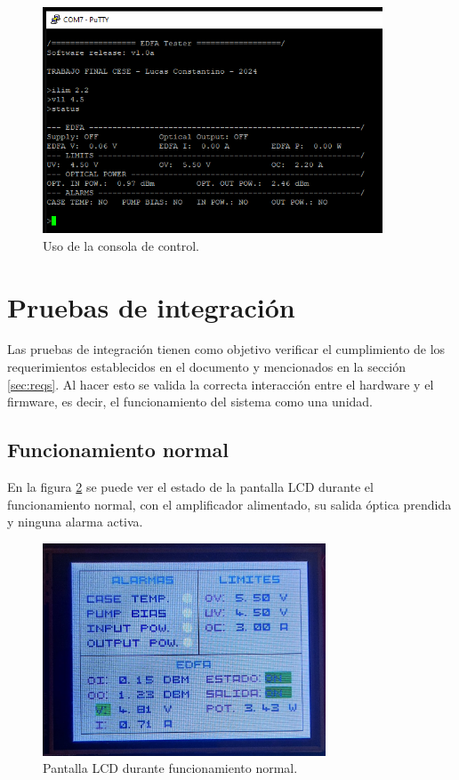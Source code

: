 \begin{figure}[H]
\centering
\includegraphics[width=0.9\textwidth]{./Figures/pruebaConsola.png}
\caption{Uso de la consola de control.}
\label{fig:pruebaConsola}
\end{figure}

\section{Pruebas de integración}
\label{sec:pruebasInt}

Las pruebas de integración tienen como objetivo verificar el cumplimiento de los requerimientos establecidos en el documento \citep{DOC_REQ} y mencionados en la sección \ref{sec:reqs}. Al hacer esto se valida la correcta interacción entre el hardware y el firmware, es decir, el funcionamiento del sistema como una unidad.

\subsection{Funcionamiento normal}

En la figura \ref{fig:funcNorm} se puede ver el estado de la pantalla LCD durante el funcionamiento normal, con el amplificador alimentado, su salida óptica prendida y ninguna alarma activa.

\begin{figure}[H]
\centering
\includegraphics[width=0.75\textwidth]{./Figures/funcNorm.jpg}
\caption{Pantalla LCD durante funcionamiento normal.}
\label{fig:funcNorm}
\end{figure}

